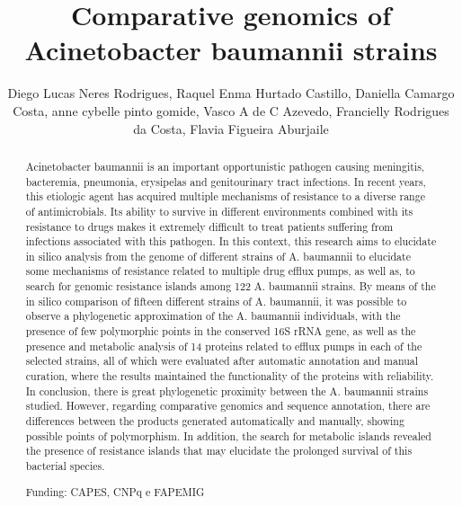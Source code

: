 \documentclass[twoside]{article}
\title{\vspace{-15mm}\fontsize{24pt}{10pt}\selectfont\textbf{ Comparative genomics of Acinetobacter baumannii strains }} %
\author{ Diego Lucas Neres Rodrigues, Raquel Enma Hurtado Castillo, Daniella Camargo Costa, anne cybelle pinto gomide, Vasco A de C Azevedo, Francielly Rodrigues da Costa, Flavia Figueira Aburjaile }
\affil{ UFMG }
\date{}
\begin{document}
  
  
  \maketitle %
  
  
  \thispagestyle{fancy} %
  
  
  \begin{abstract}
  Acinetobacter baumannii is an important opportunistic pathogen causing meningitis,  bacteremia,  pneumonia,  erysipelas and genitourinary tract infections. In recent years,  this etiologic agent has acquired multiple mechanisms of resistance to a diverse range of antimicrobials. Its ability to survive in different environments combined with its resistance to drugs makes it extremely difficult to treat patients suffering from infections associated with this pathogen. In this context,  this research aims to elucidate in silico analysis from the genome of different strains of A. baumannii to elucidate some mechanisms of resistance related to multiple drug efflux pumps,  as well as,  to search for genomic resistance islands among 122 A. baumannii strains. By means of the in silico comparison of fifteen different strains of A. baumannii,  it was possible to observe a phylogenetic approximation of the A. baumannii individuals,  with the presence of few polymorphic points in the conserved 16S rRNA gene,  as well as the presence and metabolic analysis of 14 proteins related to efflux pumps in each of the selected strains,  all of which were evaluated after automatic annotation and manual curation,  where the results maintained the functionality of the proteins with reliability. In conclusion,  there is great phylogenetic proximity between the A. baumannii strains studied. However,  regarding comparative genomics and sequence annotation,  there are differences between the products generated automatically and manually,  showing possible points of polymorphism. In addition,  the search for metabolic islands revealed the presence of resistance islands that may elucidate the prolonged survival of this bacterial species.
  
  Funding: CAPES,  CNPq e FAPEMIG \\ 
  \end{abstract}
  
\end{document}
